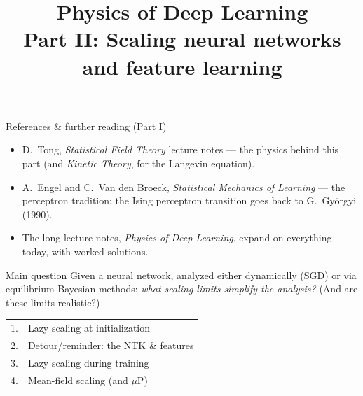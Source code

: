 \documentclass[11pt]{beamer}
\begin{document}
\begin{frame}{References \& further reading (Part I)}
  \small
  \begin{itemize}
    \item D.~Tong, \emph{Statistical Field Theory} lecture notes ---
      the physics behind this part (and \emph{Kinetic Theory}, for the
      Langevin equation).
    \item A.~Engel and C.~Van den Broeck, \emph{Statistical Mechanics of
      Learning} --- the perceptron tradition; the Ising perceptron
      transition goes back to G.~Gy\"orgyi (1990).
    \item The long lecture notes, \emph{Physics of Deep Learning},
      expand on everything today, with worked solutions.
  \end{itemize}
\end{frame}

\title{Physics of Deep Learning\\[2pt]
\large Part II: Scaling neural networks and feature learning}
\begin{frame}
  \titlepage
  \vspace{-2mm}
  \begin{block}{Main question}
    Given a neural network, analyzed either dynamically (SGD) or via
    equilibrium Bayesian methods: \emph{what scaling limits simplify the
    analysis?} (And are these limits realistic?)
  \end{block}
  \begin{center}\small
  \begin{tabular}{ll}
    1. & Lazy scaling at initialization \\
    2. & Detour/reminder: the NTK \& features \\
    3. & Lazy scaling during training \\
    4. & Mean-field scaling (and $\mu$P)
  \end{tabular}
  \end{center}
\end{frame}
\end{document}
